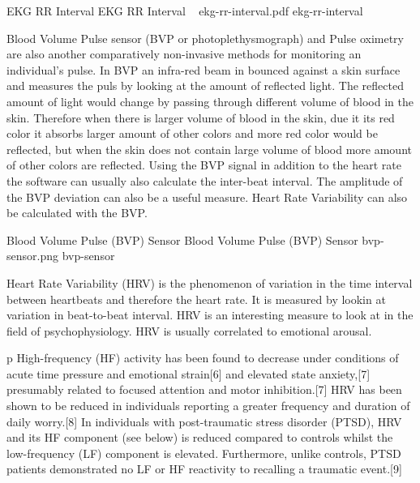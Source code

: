 \img
{EKG RR Interval}
{EKG RR Interval ~\cite{wiki2014bvp}}
{ekg-rr-interval.pdf}
{ekg-rr-interval}

Blood Volume Pulse sensor (BVP or photoplethysmograph) and Pulse oximetry are also another comparatively non-invasive methods for monitoring an individual's pulse. In BVP an infra-red beam in bounced against a skin surface and measures the puls by looking at the amount of reflected light. The reflected amount of light would change by passing through different volume of blood in the skin. Therefore when there is larger volume of blood in the skin, due it its red color it absorbs larger amount of other colors and more red color would be reflected, but when the skin does not contain large volume of blood more amount of other colors are reflected. Using the BVP signal in addition to the heart rate the software can usually also calculate the inter-beat interval. The amplitude of the BVP deviation can also be a useful measure. Heart Rate Variability can also be calculated with the BVP.

\img
{Blood Volume Pulse (BVP) Sensor}
{Blood Volume Pulse (BVP) Sensor}
{bvp-sensor.png}
{bvp-sensor}

Heart Rate Variability (HRV) is the phenomenon of variation in the time interval between heartbeats and therefore the heart rate. It is measured by lookin at variation in beat-to-beat interval. HRV is an interesting measure to look at in the field of psychophysiology. HRV is usually correlated to emotional arousal. %

p High-frequency (HF) activity has been found to decrease under conditions of acute time pressure and emotional strain[6] and elevated state anxiety,[7] presumably related to focused attention and motor inhibition.[7] HRV has been shown to be reduced in individuals reporting a greater frequency and duration of daily worry.[8] In individuals with post-traumatic stress disorder (PTSD), HRV and its HF component (see below) is reduced compared to controls whilst the low-frequency (LF) component is elevated. Furthermore, unlike controls, PTSD patients demonstrated no LF or HF reactivity to recalling a traumatic event.[9]

